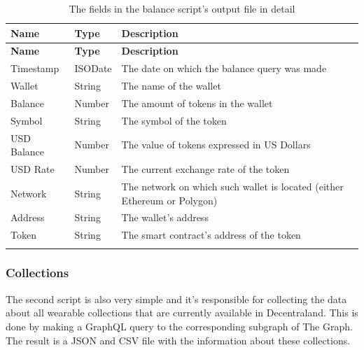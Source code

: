 \documentclass[MSE,Master,english]{twbook}%
\begin{document}
\begin{xltabular}{\textwidth}{|l|l|X|}
  \hline
  \textbf{Name} & \textbf{Type} & \textbf{Description}                         \\ \hline
  \endfirsthead
  \hline
  \textbf{Name} & \textbf{Type} & \textbf{Description}                         \\ \hline
  \endhead
  Timestamp     & ISODate       & The date on which the balance query was made \\ \hline
  Wallet        & String        & The name of the wallet                       \\ \hline
  Balance       & Number        & The amount of tokens in the wallet           \\ \hline
  Symbol        & String        & The symbol of the token                      \\ \hline
  USD Balance   & Number        & The value of tokens expressed in US Dollars  \\ \hline
  USD Rate      & Number        & The current exchange rate of the token       \\ \hline
  Network & String & The network on which such wallet is located (either Ethereum or Polygon) \\ \hline
  Address       & String        & The wallet's address                         \\ \hline
  Token         & String        & The smart contract's address of the token    \\ \hline
  \caption{The fields in the balance script's output file in detail}
  \label{table:balace}
\end{xltabular}

\subsubsection{Collections}
The second script is also very simple and it's responsible for collecting the data about all wearable collections that are currently available in Decentraland. This is done by making a GraphQL\cite{graphql} query to the corresponding subgraph of The Graph. The result is a JSON and CSV file with the information about these collections. \\
\end{document}
